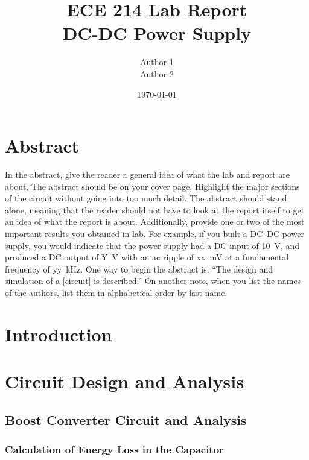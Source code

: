 \documentclass[11pt]{article}
\begin{document}
\title{ \textbf{ECE 214 Lab Report}\\
	DC-DC Power Supply}
\author{Author 1\\
  	Author 2}
\date{\today}
\maketitle
\thispagestyle{empty}

\section*{Abstract}
\noindent In the abstract, give the reader a general idea of what the lab and report are about. The abstract should be on your cover page. Highlight the major sections of the circuit without going into too much detail. The abstract should stand alone, meaning that the reader should not have to look at the report itself to get an idea of what the report is about. Additionally, provide one or two of the most important results you obtained in lab. For example, if you built a DC--DC power supply, you would indicate that the power supply had a DC input of 10~V, and produced a DC output of Y~V with an ac ripple of xx~mV at a fundamental frequency of yy~kHz. One way to begin the abstract is:
``The design and simulation of a [circuit] is described.''
On another note, when you list the names of the authors, list them in alphabetical order by last name.


\newpage
\tableofcontents

\newpage
\listoffigures

\newpage
\listoftables

\newpage 
{} %

\section{Introduction}

\section{Circuit Design and Analysis}

\subsection{Boost Converter Circuit and Analysis}

\subsubsection{Calculation of Energy Loss in the Capacitor}
\end{document}
